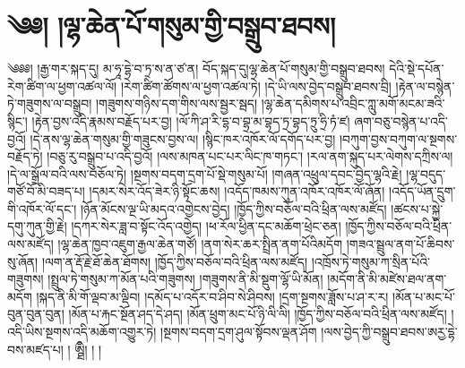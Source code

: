 \chapter{༄༅། །ལྷ་ཆེན་པོ་གསུམ་གྱི་བསྒྲུབ་ཐབས།}༄༅༅། །རྒྱ་གར་སྐད་དུ། མ་ཧཱ་དྷེ་བ་ཏྲ་ས་ན་ཙ་ན། བོད་སྐད་དུ།ལྷ་ཆེན་པོ་གསུམ་གྱི་བསྒྲུབ་ཐབས། དེའི་སྡེ་དཔོན་རེག་ཚིག་ལ་ཕྱག་འཚལ་ལོ། །རེག་ཚིག་ཚོགས་ལ་ཕྱག་འཚལ་ཏེ། །དེ་ཡི་ལས་བྱེད་བསྒྲུབ་ཐབས་བྲི། །རྟེན་ལ་བསྙེན་ཏེ་གཟུགས་ལ་བསྒྲུབ། །གཟུགས་གཉིས་དག་གིས་ལས་སྦྱར་སྦད། །ལྷ་ཆེན་དམིགས་པ་འབྲིང་ཀླུ་མགོ་མངམ་ཟའི་སྙིང་། །རྟེན་བྱས་འདི་རྣམས་བརྗོད་པར་བྱ། །ལོ་ཀི་ཤ་རི་དྷ་བ་བྷྲ་མ་བྷད་ཏྲ་བྷད་ཏྲུ་ཧྲི་ཏཾ་ཛ། ཞག་བཅུ་བསྙེན་པ་འདི་བྱའོ། །དེ་ནས་ལྷ་ཆེན་གསུམ་གྱི་གཟུངས་བྱས་ལ། །སྙིང་ཁར་འཁོར་ལོ་དགོད་པར་བྱ། །བཀུག་བྱས་བཀུག་ལ་སྔགས་བརྗོད་ཏེ། །བཅུ་རུ་བསྒྲུབ་པ་འདི་བྱའོ། །ལས་མཁན་པང་པར་ལིང་ཁ་གཏང་། །རལ་ནག་སྐུད་པར་ལེགས་དཀྲིས་ལ། །དེ་ལ་སྒྲོལ་བའི་ལས་བཅོལ་ཏེ། །སྔགས་བདག་དྲག་པོ་སྡེ་གསུམ་པོ། །གཞན་འཕྲུལ་དབང་བྱེད་ལྷའི་རྗེ། །ལྷ་བདུད་གཙོ་བོ་མི་བཟད་པ། །དམར་སེར་འོད་ཟེར་ཉི་སྟོང་ཆས། །འདོད་ཁམས་ཀུན་འཁོར་འཁོར་ལོ་ཞོན། །འདོད་ཡོན་དྲུག་གི་འཁོར་ལོ་དང་། །ཉོན་མོངས་ལྔ་ཡི་མདའ་འགྱེངས་བྱེད། །ཁྱོད་ཀྱིས་བཅོལ་བའི་ཕྲིན་ལས་མཛོད། །ཚངས་པ་སྐྱེ་དགུ་ཀུན་གྱི་རྗེ། །དཀར་སེར་ཟླ་བ་སྟོང་འོད་འགྱེད། །ཕ་རོལ་ཕྱིན་དང་མཆོག་ཕྲེང་ཅན། །ཁྱོད་ཀྱིས་བཅོལ་བའི་ཕྲིན་ལས་མཛོད། །ལྷ་ཆེན་ཁྱབ་འཇུག་རྒྱལ་ཆེན་གཙོ། །ནག་སེར་ཆར་སྤྲིན་ནག་པོའིམདོག །གཟའ་སྦྲུལ་ནག་པོ་ཆིབས་སུ་ཞོན། །ལག་ན་རྡོ་རྗེ་ཐོ་ཆེན་ཐོགས། །ཁྱོད་ཀྱིས་བཅོལ་བའི་ཕྲིན་ལས་མཛོད། །འཁྲོས་ཏེ་གསུམ་ཀ་སྲིན་པོའི་གཟུགས། །སྤྲུལ་ཏེ་གསུམ་ཀ་མོན་པའི་གཟུགས། །གཟུགས་ནི་མི་སྡུག་ལྷོ་ཡི་མོན། །མདོག་ནི་མི་མཛེས་ཐལ་ནག་མདོག །སྐད་ནི་མི་གོ་ལྡབ་མ་ལྡིབ། །དམོད་པ་འདོར་བ་ཤིབ་སེ་ཤིབས། །དྲག་སྔགས་ཟློས་པ་ཤ་ར་ར། །མོན་པ་མང་པོ་བུན་བུན་བུན། །མོན་པ་རྐང་སྔོན་ཤད་དེ་ཤད། །མོན་ཕྲུག་མང་པོ་ཉི་ལི་ལི། །ཁྱོད་ཀྱིས་བཅོལ་བའི་ཕྲིན་ལས་མཛོད། །འདི་ཡིས་སྔགས་འདི་མཆོག་འགྱུར་ཏེ། །སྔགས་བདག་དྲག་ཤུལ་སྟོབས་ལྡན་ཤོག །ལས་བྱེད་ཀྱི་བསྒྲུབ་ཐབས་ཨརྱ་དྷེ་བས་མཛད་པ། ། ཨྠྀི། ། །